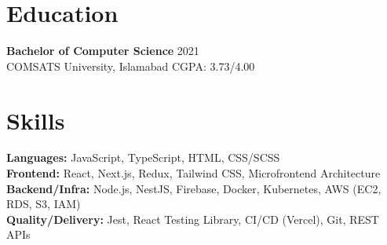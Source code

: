 \documentclass[9pt,letterpaper]{article}
\begin{document}
\section*{Education}
\textbf{Bachelor of Computer Science} \hfill 2021 \\
COMSATS University, Islamabad \hfill CGPA: 3.73/4.00

\section*{Skills}
\textbf{Languages:} JavaScript, TypeScript, HTML, CSS/SCSS \\
\textbf{Frontend:} React, Next.js, Redux, Tailwind CSS, Microfrontend Architecture \\
\textbf{Backend/Infra:} Node.js, NestJS, Firebase, Docker, Kubernetes, AWS (EC2, RDS, S3, IAM) \\
\textbf{Quality/Delivery:} Jest, React Testing Library, CI/CD (Vercel), Git, REST APIs
\end{document}
